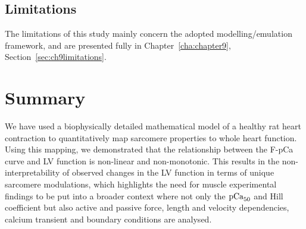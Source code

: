 %
%
%
\subsection{Limitations}\label{sec:ch8limitations}
The limitations of this study mainly concern the adopted modelling/emulation framework, and are presented fully in Chapter~\ref{cha:chapter9}, Section~\ref{sec:ch9limitations}.

%
%
%
\section{Summary}\label{sec:ch8summary}
We have used a biophysically detailed mathematical model of a healthy rat heart contraction to quantitatively map sarcomere properties to whole heart function. Using this mapping, we demonstrated that the relationship between the F-pCa curve and LV function is non-linear and non-monotonic. This results in the non-interpretability of observed changes in the LV function in terms of unique sarcomere modulations, which highlights the need for muscle experimental findings to be put into a broader context where not only the $\textrm{pCa}_{50}$ and Hill coefficient but also active and passive force, length and velocity dependencies, calcium transient and boundary conditions are analysed.
